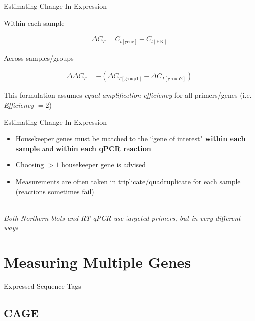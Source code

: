 \documentclass[aspectratio=169,11pt]{beamer}
\begin{document}
\begin{frame}{Estimating Change In Expression}

	Within each sample

	\begin{align*}
	\Delta C_T = C_{t[\text{gene}]} - C_{t[\text{HK}]}
	\end{align*}
	
	Across samples/groups
	
	\begin{align*}
	\Delta \Delta C_T = - (\Delta C_{T[\text{group1}]} - \Delta C_{T[\text{group2}]})
	\end{align*}
	
	This formulation assumes \textit{equal amplification efficiency} for all primers/genes (i.e. \textit{Efficiency} $= 2$)

\end{frame}

\begin{frame}{Estimating Change In Expression}

	\begin{itemize}
		\item Housekeeper genes must be matched to the ``gene of interest" \textbf{within each sample} and \textbf{within each qPCR reaction}
		\item Choosing $>1$ housekeeper gene is advised
		\item Measurements are often taken in triplicate/quadruplicate for each sample (reactions sometimes fail)
	\end{itemize}
	
	~\\
	\textit{Both Northern blots and RT-qPCR use targeted primers, but in very different ways}

\end{frame}

\section{Measuring Multiple Genes}


\begin{frame}{Expressed Sequence Tags}

\end{frame}

\subsection{CAGE}
\end{document}
